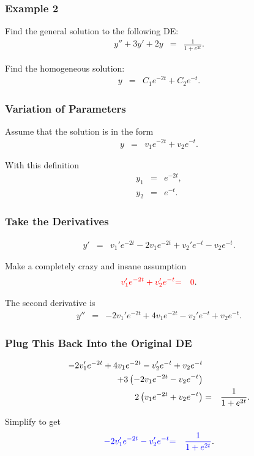 \begin{frame}
  \frametitle{Example 2}
  Find the general solution to the following DE:
  \begin{eqnarray*}
          y'' + 3y' + 2y & = & \frac{1}{1+e^{2t}}.
  \end{eqnarray*}

  {
    Find the homogeneous solution:
    \begin{eqnarray*}
      y & = & C_1 e^{-2t} + C_2 e^{-t}.
    \end{eqnarray*}
  }

\end{frame}


\begin{frame}
  \frametitle{Variation of Parameters}

  Assume that the solution is in the form
  \begin{eqnarray*}
    y & = & v_1 e^{-2t} + v_2 e^{-t}.
  \end{eqnarray*}

  With this definition
  \begin{eqnarray*}
    y_1 & = & e^{-2t}, \\
    y_2 & = & e^{-t}.
  \end{eqnarray*}

\end{frame}

\begin{frame}
  \frametitle{Take the Derivatives}
  \begin{eqnarray*}
    y' & = & v_1'e^{-2t} -2 v_1 e^{-2t} + v_2' e^{-t} - v_2 e^{-t}.
  \end{eqnarray*}

  Make a completely crazy and insane assumption
  \begin{eqnarray*}
    {\color{red}v_1'e^{-2t} + v_2' e^{-t}} & {\color{red}=} & {\color{red}0}.
  \end{eqnarray*}

  The second derivative is
  \begin{eqnarray*}
    y'' & = & -2 v_1' e^{-2t} + 4 v_1 e^{-2t} - v_2' e^{-t} + v_2 e^{-t}.
  \end{eqnarray*}
\end{frame}

\begin{frame}
  \frametitle{Plug This Back Into the Original DE}

  \begin{eqnarray*}
    -2 v_1' e^{-2t} + 4 v_1 e^{-2t} - v_2' e^{-t} + v_2 e^{-t} & & \\
    + 3 \left( -2 v_1 e^{-2t} - v_2 e^{-t} \right) & & \\
    2 \left( v_1 e^{-2t} + v_2 e^{-t} \right) & = & \frac{1}{1+e^{2t}}.
  \end{eqnarray*}

  Simplify to get
  \begin{eqnarray*}
    {\color{blue}-2 v_1' e^{-2t}  - v_2' e^{-t}} & {\color{blue}=} & {\color{blue}\frac{1}{1+e^{2t}}}.
  \end{eqnarray*}

\end{frame}


